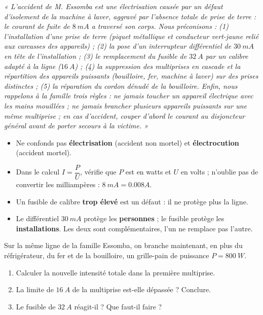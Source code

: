 \documentclass[11pt]{article}
\begin{document}
\begin{exoresolu}
\emph{« L'accident de M. Essomba est une électrisation causée par un défaut d'isolement de la machine à laver, aggravé par l'absence totale de prise de terre : le courant de fuite de $\SI{8}{mA}$ a traversé son corps. Nous préconisons : (1) l'installation d'une prise de terre (piquet métallique et conducteur vert-jaune relié aux carcasses des appareils) ; (2) la pose d'un interrupteur différentiel de $\SI{30}{mA}$ en tête de l'installation ; (3) le remplacement du fusible de $\SI{32}{A}$ par un calibre adapté à la ligne ($\SI{16}{A}$) ; (4) la suppression des multiprises en cascade et la répartition des appareils puissants (bouilloire, fer, machine à laver) sur des prises distinctes ; (5) la réparation du cordon dénudé de la bouilloire. Enfin, nous rappelons à la famille trois règles : ne jamais toucher un appareil électrique avec les mains mouillées ; ne jamais brancher plusieurs appareils puissants sur une même multiprise ; en cas d'accident, couper d'abord le courant au disjoncteur général avant de porter secours à la victime. »}
\end{exoresolu}

\begin{attention}
\begin{itemize}
\item Ne confonds pas \textbf{électrisation} (accident non mortel) et \textbf{électrocution} (accident mortel).
\item Dans le calcul $I = \dfrac{P}{U}$, vérifie que $P$ est en watts et $U$ en volts ; n'oublie pas de convertir les milliampères : $\SI{8}{mA} = \num{0,008}{A}$.
\item Un fusible de calibre \textbf{trop élevé} est un défaut : il ne protège plus la ligne.
\item Le différentiel $\SI{30}{mA}$ protège les \textbf{personnes} ; le fusible protège les \textbf{installations}. Les deux sont complémentaires, l'un ne remplace pas l'autre.
\end{itemize}
\end{attention}

\begin{exercice}
Sur la même ligne de la famille Essomba, on branche maintenant, en plus du réfrigérateur, du fer et de la bouilloire, un grille-pain de puissance $P = \SI{800}{W}$.
\begin{enumerate}
\item Calculer la nouvelle intensité totale dans la première multiprise.
\item La limite de $\SI{16}{A}$ de la multiprise est-elle dépassée ? Conclure.
\item Le fusible de $\SI{32}{A}$ réagit-il ? Que faut-il faire ?
\end{enumerate}
\end{exercice}
\end{document}
